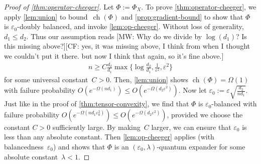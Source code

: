 \documentclass[aos]{imsart}
\theoremstyle{definition}
\numberwithin{equation}{section}
\DeclareMathOperator{\ch}{ch}
\newcommand{\eps}{\varepsilon}
\newcommand{\CF}[1]{{\color{purple}[CF: #1]}}
\newcommand{\MW}[1]{{\color{red}[MW: #1]}}
\newcommand{\CF}[1]{{}}
\newcommand{\MW}[1]{{}}
\begin{document}
\begin{appendix}
\begin{proof}[Proof of \cref{thm:operator-cheeger}]
Let $\Phi:=\Phi_X$.
To prove \cref{thm:operator-cheeger}, we apply \cref{lem:union} to bound~$\ch(\Phi)$ and \cref{prop:gradient-bound} to show that $\Phi$ is $\eps_0$-doubly balanced, and invoke \cref{lem:op-cheeger}.
Without loss of generality, $d_1 \leq d_2$.
Thus our assumption reads
\MW{Why do we divide by $\log(d_1)$? Is this missing above?}\CF{yes, it was missing above, I think from when I thought we couldn't put it there. but now I think that again, so it's fine above.}
\begin{align*}
  n \geq C \frac{d_2}{d_1} \max\{\log \frac{d_2}{d_1}, \frac1{\eps^2}, \eps^2 \}
\end{align*}
for some universal constant~$C>0$.
Then, \cref{lem:union} shows $\ch(\Phi) = \Omega(1)$ with failure probability $O(e^{- \Omega(n d_1)}) \leq O(e^{- \Omega(d_2 \eps^2)})$.
Now let $\eps_0 := \eps \sqrt{\frac{d_2}{n d_1}}$.
Just like in the proof of \cref{thm:tensor-convexity}, we find that $\Phi$ is $\eps_0$-balanced with failure probability $O(e^{-\Omega(n d_1 \eps_0^2)}) \leq O(e^{-\Omega(d_2 \eps^2)})$, provided we choose the constant $C>0$ sufficiently large.
By making~$C$ larger, we can ensure that $\eps_0$ is less than any absolute constant.
Then \cref{lem:op-cheeger} applies (with balancedness~$\eps_0$) and shows that $\Phi$ is an $(\eps_0,\lambda)$-quantum expander for some absolute constant~$\lambda<1$.
\end{proof}


\end{appendix}
\end{document}
